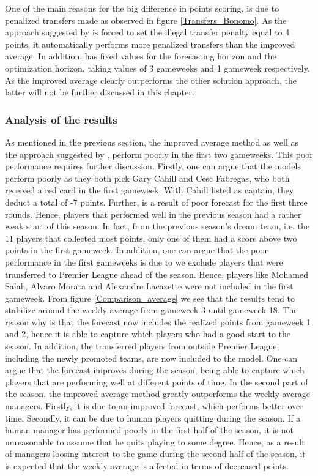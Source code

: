 One of the main reasons for the big difference in points scoring, is due to penalized transfers made as observed in figure \ref{Transfers_Bonomo}. As the approach suggested by \cite{Bonomo} is forced to set the illegal transfer penalty equal to 4 points, it automatically performs more penalized transfers than the improved average. In addition, \cite{Bonomo} has fixed values for the forecasting horizon and the optimization horizon, taking values of 3 gameweeks and 1 gameweek respectively. As the improved average clearly outperforms the other solution approach, the latter will not be further discussed in this chapter.

\subsubsection{Analysis of the results}
As mentioned in the previous section, the improved average method as well as the approach suggested by \citep{Bonomo}, perform poorly in the first two gameweeks. This poor performance requires further discussion. Firstly, one can argue that the models perform poorly as they both pick Gary Cahill and Cesc Fabregas, who both received a red card in the first gameweek. With Cahill listed as captain, they deduct a total of -7 points. Further, is a result of poor forecast for the first three rounds. Hence, players that performed well in the previous season had a rather weak start of this season. In fact, from the previous season's dream team, i.e. the 11 players that collected most points, only one of them had a score above two points in the first gameweek. In addition, one can argue that the poor performance in the first gameweeks is due to we exclude players that were transferred to Premier League ahead of the season. Hence, players like Mohamed Salah, Alvaro Morata and Alexandre Lacazette were not included in the first gameweek. 
\newpar
From figure \ref{Comparison_average} we see that the results tend to stabilize around the weekly average from gameweek 3 until gameweek 18. The reason why is that the forecast now includes the realized points from gameweek 1 and 2, hence it is able to capture which players who had a good start to the season. In addition, the transferred players from outside Premier League, including the newly promoted teams, are now included to the model. One can argue that the forecast improves during the season, being able to capture which players that are performing well at different points of time. 
\newpar
In the second part of the season, the improved average method greatly outperforms the weekly average managers. Firstly, it is due to an improved forecast, which performs better over time. Secondly, it can be due to human players quitting during the season. If a human manager has performed poorly in the first half of the season, it is not unreasonable to assume that he quits playing to some degree. Hence, as a result of managers loosing interest to the game during the second half of the season, it is expected that the weekly average is affected in terms of decreased points.
